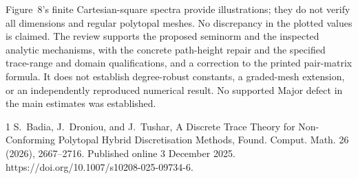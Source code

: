 \documentclass[10pt]{article}
\begin{document}
Figure 8’s finite Cartesian-square spectra provide illustrations; they do not verify all dimensions and regular polytopal meshes. No discrepancy in the plotted values is claimed. The review supports the proposed seminorm and the inspected analytic mechanisms, with the concrete path-height repair and the specified trace-range and domain qualifications, and a correction to the printed pair-matrix formula. It does not establish degree-robust constants, a graded-mesh extension, or an independently reproduced numerical result. No supported Major defect in the main estimates was established.\par
1 S. Badia, J. Droniou, and J. Tushar, A Discrete Trace Theory for Non-Conforming Polytopal Hybrid Discretisation Methods, Found. Comput. Math. 26 (2026), 2667–2716. Published online 3 December 2025. https://doi.org/10.1007/s10208-025-09734-6.\par
\end{document}

